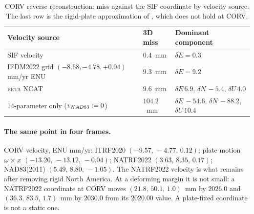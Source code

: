 \documentclass[main.tex]{subfiles}
\begin{document}
\begin{table}[htbp]
\centering\small
\caption{CORV reverse reconstruction: miss against the SIF coordinate by
velocity source.  The last row is the rigid-plate approximation of
, which does not hold at CORV.}
\label{tab:trf-corv-reverse}
\begin{tabular}{lll}
\toprule
\textbf{Velocity source} & \textbf{3D miss} & \textbf{Dominant component} \\
\midrule
SIF velocity                       & $0.4$~mm   & $\delta E = 0.3$ \\
IFDM2022 grid $(-8.68,-4.78,+0.04)$ mm/yr ENU & $9.3$~mm & $\delta E = 9.2$ \\
\textsc{beta} NCAT                 & $9.6$~mm   & $\delta E\,6.9$, $\delta N\,-5.4$, $\delta U\,4.0$ \\
14-parameter only ($v_{NAD83} := 0$) & $104.2$~mm & $\delta E\,-54.6$, $\delta N\,-88.2$, $\delta U\,10.4$ \\
\bottomrule
\end{tabular}
\end{table}

\paragraph{The same point in four frames.}  CORV velocity, ENU mm/yr:
ITRF2020 $(-9.57,\,-4.77,\,0.12)$; plate motion $\omega\times x$
$(-13.20,\,-13.12,\,-0.04)$; NATRF2022 $(3.63,\,8.35,\,0.17)$;
NAD83(2011) $(5.49,\,8.80,\,-1.05)$.  The NATRF2022 velocity is what
remains after removing rigid North America.  At a deforming margin it
is not small: a NATRF2022 coordinate at CORV moves
$(21.8,\,50.1,\,1.0)$~mm by $2026.0$ and $(36.3,\,83.5,\,1.7)$~mm by
$2030.0$ from its $2020.00$ value.  A plate-fixed coordinate is not a
static one.
\end{document}
